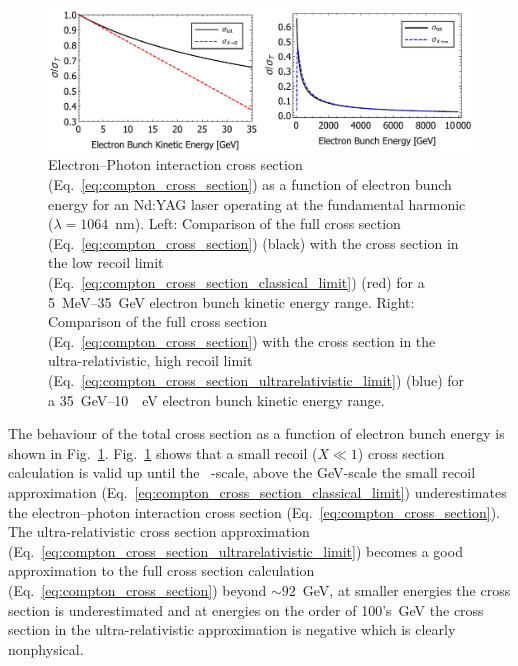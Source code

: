 \documentclass[../main.tex]{subfiles}
\begin{document}
\begin{figure}[!h]
\centering
\includegraphics[width=\textwidth]{Figures/Photon_Production_by_Inverse_Compton_Scattering/Cross_Section_Electron_Bunch_Energy_NDYAG.pdf}
\caption{Electron--Photon interaction cross section (Eq.~\ref{eq:compton_cross_section}) as a function of electron bunch energy for an Nd:YAG laser operating at the fundamental harmonic ($\lambda = 1064$~\si{\nano\meter}). Left: Comparison of the full cross section (Eq.~\ref{eq:compton_cross_section}) (black) with the cross section in the low recoil limit (Eq.~\ref{eq:compton_cross_section_classical_limit}) (red) for a 5~\si{\mega\electronvolt}--35~\si{\giga\electronvolt} electron bunch kinetic energy range. Right: Comparison of the full cross section (Eq.~\ref{eq:compton_cross_section}) with the cross section in the ultra-relativistic, high recoil limit (Eq.~\ref{eq:compton_cross_section_ultrarelativistic_limit}) (blue) for a 35~\si{\giga\electronvolt}--10~\si{\terra\electronvolt} electron bunch kinetic energy range.}
\label{fig:cross_section_electron_energy}
\end{figure}

The behaviour of the total cross section as a function of electron bunch energy is shown in Fig.~\ref{fig:cross_section_electron_energy}. Fig.~\ref{fig:cross_section_electron_energy} shows that a small recoil ($X \ll 1$) cross section calculation is valid up until the \si{\giga\electron}-scale, above the \si{\giga\electronvolt}-scale the small recoil approximation (Eq.~\ref{eq:compton_cross_section_classical_limit}) underestimates the electron--photon interaction cross section (Eq.~\ref{eq:compton_cross_section}). The ultra-relativistic cross section approximation (Eq.~\ref{eq:compton_cross_section_ultrarelativistic_limit}) becomes a good approximation to the full cross section calculation (Eq.~\ref{eq:compton_cross_section}) beyond  $\sim92$~\si{\giga\electronvolt}, at smaller energies the cross section is underestimated and at energies on the order of 100's~\si{\giga\electronvolt} the cross section in the ultra-relativistic approximation is negative which is clearly nonphysical.     
\end{document}
